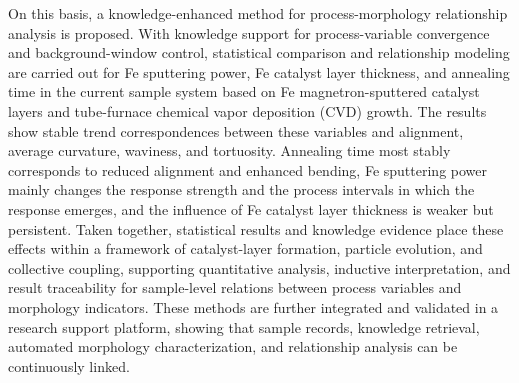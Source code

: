 \begin{enabstract}
On this basis, a knowledge-enhanced method for process-morphology relationship analysis is proposed. With knowledge support for process-variable convergence and background-window control, statistical comparison and relationship modeling are carried out for Fe sputtering power, Fe catalyst layer thickness, and annealing time in the current sample system based on Fe magnetron-sputtered catalyst layers and tube-furnace chemical vapor deposition (CVD) growth. The results show stable trend correspondences between these variables and alignment, average curvature, waviness, and tortuosity. Annealing time most stably corresponds to reduced alignment and enhanced bending, Fe sputtering power mainly changes the response strength and the process intervals in which the response emerges, and the influence of Fe catalyst layer thickness is weaker but persistent. Taken together, statistical results and knowledge evidence place these effects within a framework of catalyst-layer formation, particle evolution, and collective coupling, supporting quantitative analysis, inductive interpretation, and result traceability for sample-level relations between process variables and morphology indicators. These methods are further integrated and validated in a research support platform, showing that sample records, knowledge retrieval, automated morphology characterization, and relationship analysis can be continuously linked.

\end{enabstract}

